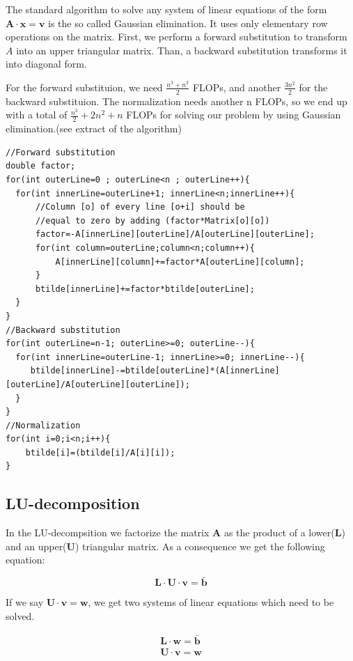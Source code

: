 \documentclass[10pt,a4paper]{article}
\begin{document}
The standard algorithm to solve any system of linear equations of the form $\mathbf{A}\cdot\mathbf{x}=\mathbf{v}$ is the so called Gaussian elimination. It uses only elementary row operations on the matrix. First, we perform a forward substitution to transform $A$ into an upper triangular matrix. Than, a backward substitution transforms it into diagonal form.

For the forward substituion, we need $\frac{n^3+n^2}{2}$ FLOPs, and another $\frac{3n^2}{2}$ for the backward substituion. The normalization needs another n FLOPs, so we end up with a total of $\frac{n^3}{2}+2n^2+n$ FLOPs for solving our problem by using Gaussian elimination.(see extract of the algorithm)

\begin{lstlisting}
//Forward substitution
double factor;
for(int outerLine=0 ; outerLine<n ; outerLine++){
  for(int innerLine=outerLine+1; innerLine<n;innerLine++){
      //Column [o] of every line [o+i] should be 
      //equal to zero by adding (factor*Matrix[o][o])
      factor=-A[innerLine][outerLine]/A[outerLine][outerLine];
      for(int column=outerLine;column<n;column++){
          A[innerLine][column]+=factor*A[outerLine][column];
      }
      btilde[innerLine]+=factor*btilde[outerLine];
  }
}
//Backward substitution
for(int outerLine=n-1; outerLine>=0; outerLine--){
  for(int innerLine=outerLine-1; innerLine>=0; innerLine--){
     btilde[innerLine]-=btilde[outerLine]*(A[innerLine][outerLine]/A[outerLine][outerLine]);
  }
}
//Normalization
for(int i=0;i<n;i++){
    btilde[i]=(btilde[i]/A[i][i]);
}
\end{lstlisting}

\subsection{LU-decomposition}

In the LU-decompsition we factorize the matrix $\mathbf A$ as the product of a lower($\mathbf L$) and an upper($\mathbf{U}$) triangular matrix. As a consequence we get the following equation:

\begin{equation}
\mathbf{L \cdot U \cdot v = \bar{b}}
\end{equation}

If we say $\mathbf{U \cdot v = w}$, we get two systems of linear equations which need to be solved.

\begin{gather}
\mathbf{L \cdot w = \bar{b}} \\
\mathbf{U \cdot v = w}
\end{gather}
\end{document}
